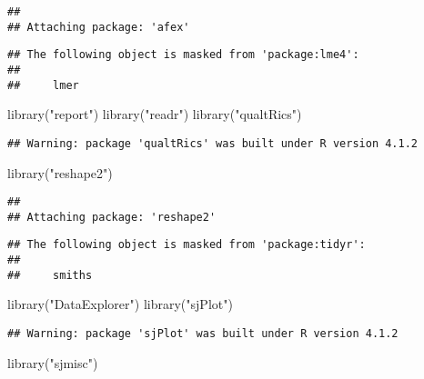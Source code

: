 \documentclass[
]{article}
\newenvironment{Shaded}{\begin{snugshade}}{\end{snugshade}}
\newcommand{\FunctionTok}[1]{\textcolor[rgb]{0.00,0.00,0.00}{#1}}
\newcommand{\NormalTok}[1]{#1}
\newcommand{\StringTok}[1]{\textcolor[rgb]{0.31,0.60,0.02}{#1}}
\begin{document}
\begin{verbatim}
## 
## Attaching package: 'afex'
\end{verbatim}

\begin{verbatim}
## The following object is masked from 'package:lme4':
## 
##     lmer
\end{verbatim}

\begin{Shaded}
\begin{Highlighting}[]
\FunctionTok{library}\NormalTok{(}\StringTok{"report"}\NormalTok{)}
\FunctionTok{library}\NormalTok{(}\StringTok{"readr"}\NormalTok{)}
\FunctionTok{library}\NormalTok{(}\StringTok{"qualtRics"}\NormalTok{)}
\end{Highlighting}
\end{Shaded}

\begin{verbatim}
## Warning: package 'qualtRics' was built under R version 4.1.2
\end{verbatim}

\begin{Shaded}
\begin{Highlighting}[]
\FunctionTok{library}\NormalTok{(}\StringTok{"reshape2"}\NormalTok{)}
\end{Highlighting}
\end{Shaded}

\begin{verbatim}
## 
## Attaching package: 'reshape2'
\end{verbatim}

\begin{verbatim}
## The following object is masked from 'package:tidyr':
## 
##     smiths
\end{verbatim}

\begin{Shaded}
\begin{Highlighting}[]
\FunctionTok{library}\NormalTok{(}\StringTok{"DataExplorer"}\NormalTok{)}
\FunctionTok{library}\NormalTok{(}\StringTok{"sjPlot"}\NormalTok{)}
\end{Highlighting}
\end{Shaded}

\begin{verbatim}
## Warning: package 'sjPlot' was built under R version 4.1.2
\end{verbatim}

\begin{Shaded}
\begin{Highlighting}[]
\FunctionTok{library}\NormalTok{(}\StringTok{"sjmisc"}\NormalTok{)}
\end{Highlighting}
\end{Shaded}
\end{document}
